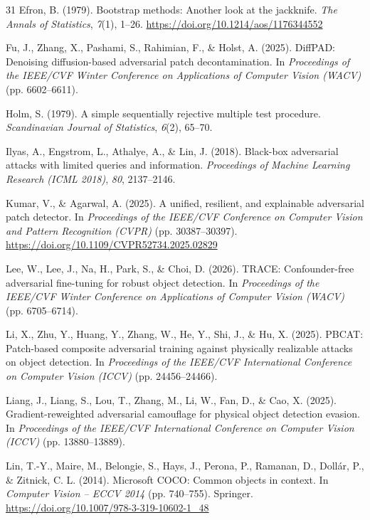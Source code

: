 \begin{thebibliography}{31}
Efron, B. (1979). Bootstrap methods: Another look at the jackknife. \textit{The Annals of Statistics}, \textit{7}(1), 1--26. \url{https://doi.org/10.1214/aos/1176344552}

Fu, J., Zhang, X., Pashami, S., Rahimian, F., \& Holst, A. (2025). DiffPAD: Denoising diffusion-based adversarial patch decontamination. In \textit{Proceedings of the IEEE/CVF Winter Conference on Applications of Computer Vision (WACV)} (pp. 6602--6611).

Holm, S. (1979). A simple sequentially rejective multiple test procedure. \textit{Scandinavian Journal of Statistics}, \textit{6}(2), 65--70.

Ilyas, A., Engstrom, L., Athalye, A., \& Lin, J. (2018). Black-box adversarial attacks with limited queries and information. \textit{Proceedings of Machine Learning Research (ICML 2018)}, \textit{80}, 2137--2146.

Kumar, V., \& Agarwal, A. (2025). A unified, resilient, and explainable adversarial patch detector. In \textit{Proceedings of the IEEE/CVF Conference on Computer Vision and Pattern Recognition (CVPR)} (pp. 30387--30397). \url{https://doi.org/10.1109/CVPR52734.2025.02829}

Lee, W., Lee, J., Na, H., Park, S., \& Choi, D. (2026). TRACE: Confounder-free adversarial fine-tuning for robust object detection. In \textit{Proceedings of the IEEE/CVF Winter Conference on Applications of Computer Vision (WACV)} (pp. 6705--6714).

Li, X., Zhu, Y., Huang, Y., Zhang, W., He, Y., Shi, J., \& Hu, X. (2025). PBCAT: Patch-based composite adversarial training against physically realizable attacks on object detection. In \textit{Proceedings of the IEEE/CVF International Conference on Computer Vision (ICCV)} (pp. 24456--24466).

Liang, J., Liang, S., Lou, T., Zhang, M., Li, W., Fan, D., \& Cao, X. (2025). Gradient-reweighted adversarial camouflage for physical object detection evasion. In \textit{Proceedings of the IEEE/CVF International Conference on Computer Vision (ICCV)} (pp. 13880--13889).

Lin, T.-Y., Maire, M., Belongie, S., Hays, J., Perona, P., Ramanan, D., Doll{\'a}r, P., \& Zitnick, C. L. (2014). Microsoft COCO: Common objects in context. In \textit{Computer Vision -- ECCV 2014} (pp. 740--755). Springer. \url{https://doi.org/10.1007/978-3-319-10602-1_48}


\end{thebibliography}
